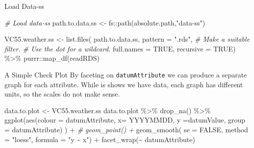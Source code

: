 \documentclass[
  ignorenonframetext,
]{beamer}
\newenvironment{Shaded}{\begin{snugshade}}{\end{snugshade}}
\newcommand{\AttributeTok}[1]{\textcolor[rgb]{0.77,0.63,0.00}{#1}}
\newcommand{\CommentTok}[1]{\textcolor[rgb]{0.56,0.35,0.01}{\textit{#1}}}
\newcommand{\ConstantTok}[1]{\textcolor[rgb]{0.00,0.00,0.00}{#1}}
\newcommand{\FunctionTok}[1]{\textcolor[rgb]{0.00,0.00,0.00}{#1}}
\newcommand{\NormalTok}[1]{#1}
\newcommand{\OtherTok}[1]{\textcolor[rgb]{0.56,0.35,0.01}{#1}}
\newcommand{\SpecialCharTok}[1]{\textcolor[rgb]{0.00,0.00,0.00}{#1}}
\newcommand{\StringTok}[1]{\textcolor[rgb]{0.31,0.60,0.02}{#1}}
\begin{document}
\begin{frame}[fragile]{Load Data-ss}
\protect\hypertarget{load-data-ss}{}
\begin{Shaded}
\begin{Highlighting}[]
\CommentTok{\# Load data{-}ss}
\NormalTok{path.to.data.ss }\OtherTok{\textless{}{-}}\NormalTok{ fs}\SpecialCharTok{::}\FunctionTok{path}\NormalTok{(absolute.path,}\StringTok{"data{-}ss"}\NormalTok{)}

\NormalTok{VC55.weather.ss }\OtherTok{\textless{}{-}} \FunctionTok{list.files}\NormalTok{(}
\NormalTok{  path.to.data.ss,}
  \AttributeTok{pattern =} \StringTok{".rds"}\NormalTok{, }\CommentTok{\# Make a suitable filter. }
  \CommentTok{\# Use the dot for a wildcard.}
  \AttributeTok{full.names =} \ConstantTok{TRUE}\NormalTok{,}
  \AttributeTok{recursive =} \ConstantTok{TRUE}\NormalTok{)  }\SpecialCharTok{\%\textgreater{}\%}
\NormalTok{  purrr}\SpecialCharTok{::}\FunctionTok{map\_df}\NormalTok{(readRDS) }
\end{Highlighting}
\end{Shaded}
\end{frame}

\begin{frame}[fragile]{A Simple Check Plot}
\protect\hypertarget{a-simple-check-plot}{}
By faceting on \texttt{datumAttribute} we can produce a separate graph
for each attribute. While is shows we have data, each graph has
different units, so the scales do not make sense.

\begin{Shaded}
\begin{Highlighting}[]
\NormalTok{data.to.plot }\OtherTok{\textless{}{-}}\NormalTok{ VC55.weather.ss}
\NormalTok{data.to.plot }\SpecialCharTok{\%\textgreater{}\%} \FunctionTok{drop\_na}\NormalTok{() }\SpecialCharTok{\%\textgreater{}\%}
\FunctionTok{ggplot}\NormalTok{(}\FunctionTok{aes}\NormalTok{(}\AttributeTok{colour =}\NormalTok{ datumAttribute, }
           \AttributeTok{x=}\NormalTok{ YYYYMMDD, }
           \AttributeTok{y =}\NormalTok{datumValue, }
           \AttributeTok{group =}\NormalTok{ datumAttribute) ) }\SpecialCharTok{+} 
 \CommentTok{\# geom\_point() +}
  \FunctionTok{geom\_smooth}\NormalTok{( }\AttributeTok{se =} \ConstantTok{FALSE}\NormalTok{, }
     \AttributeTok{method =} \StringTok{"loess"}\NormalTok{, }\AttributeTok{formula =} \StringTok{"y \textasciitilde{} x"}\NormalTok{) }\SpecialCharTok{+}
  \FunctionTok{facet\_wrap}\NormalTok{(}\SpecialCharTok{\textasciitilde{}}\NormalTok{ datumAttribute)}
\end{Highlighting}
\end{Shaded}
\end{frame}
\end{document}
